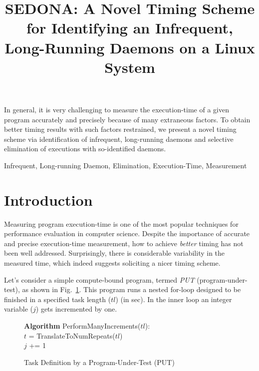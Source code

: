 \documentclass[letter]{ieice}
\title{SEDONA: A Novel Timing Scheme for Identifying an Infrequent, Long-Running Daemons on a Linux System}
\begin{document}
\maketitle

\begin{summary}
In general, it is very challenging to measure the execution-time of a given program accurately and precisely because of many extraneous factors. To obtain better timing results with such factors restrained, we present a novel timing scheme via identification of infrequent, long-running daemons and selective elimination of executions with so-identified daemons.

\end{summary}
\begin{keywords}
Infrequent, Long-running Daemon, Elimination, Execution-Time, Measurement
\end{keywords}

\section{Introduction}
\label{sec:intro}

Measuring program execution-time is one of the most popular 
techniques for performance evaluation in computer science. 
Despite the importance of accurate and precise execution-time measurement, 
how to achieve {\em better} timing has not been well addressed. 
Surprisingly, there is considerable variability in the measured time, 
which indeed suggests soliciting a nicer timing scheme.

Let's consider a simple compute-bound program, termed {\em PUT} (program-under-test), 
as shown in Fig.~\ref{alg:put}. 
This program runs a nested for-loop designed to be finished in a specified task length ($tl$) (in sec). 
In the inner loop an integer variable ($j$) gets incremented by one. 

\vspace{-.25in}
\begin{figure}[h]
\begin{center}
\begin{algorithmic}
{\bf Algorithm} PerformManyIncrements($tl$): \\
\STATE $t$ = TranslateToNumRepeats($tl$) \\
		\STATE $j$ += 1 \\
	\ENDFOR 
\ENDFOR 
\end{algorithmic}
\end{center}
\caption{Task Definition by a Program-Under-Test (PUT)\label{alg:put}}
\vspace{-.25in}
\end{figure}
\end{document}
